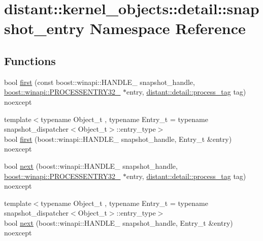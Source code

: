 \hypertarget{namespacedistant_1_1kernel__objects_1_1detail_1_1snapshot__entry}{}\section{distant\+:\+:kernel\+\_\+objects\+:\+:detail\+:\+:snapshot\+\_\+entry Namespace Reference}
\label{namespacedistant_1_1kernel__objects_1_1detail_1_1snapshot__entry}
\subsection*{Functions}
\begin{DoxyCompactItemize}
\item 
bool \mbox{\hyperlink{namespacedistant_1_1kernel__objects_1_1detail_1_1snapshot__entry_ae332dc9e96eff0233330f932eae72330}{first}} (const boost\+::winapi\+::\+H\+A\+N\+D\+L\+E\+\_\+ snapshot\+\_\+handle, \mbox{\hyperlink{namespaceboost_1_1winapi_aa148b1a2cd4a16c95b05b56d8b31cc4c}{boost\+::winapi\+::\+P\+R\+O\+C\+E\+S\+S\+E\+N\+T\+R\+Y32\+\_\+}} $\ast$entry, \mbox{\hyperlink{classdistant_1_1detail_1_1process__tag}{distant\+::detail\+::process\+\_\+tag}} tag) noexcept
\item 
{\footnotesize template$<$typename Object\+\_\+t , typename Entry\+\_\+t  = typename snapshot\+\_\+dispatcher$<$\+Object\+\_\+t$>$\+::entry\+\_\+type$>$ }\\bool \mbox{\hyperlink{namespacedistant_1_1kernel__objects_1_1detail_1_1snapshot__entry_ab69397112f991eeda47c1c4e5843c1c0}{first}} (boost\+::winapi\+::\+H\+A\+N\+D\+L\+E\+\_\+ snapshot\+\_\+handle, Entry\+\_\+t \&entry) noexcept
\item 
bool \mbox{\hyperlink{namespacedistant_1_1kernel__objects_1_1detail_1_1snapshot__entry_a7767a66970fba76928540cfc66294190}{next}} (boost\+::winapi\+::\+H\+A\+N\+D\+L\+E\+\_\+ snapshot\+\_\+handle, \mbox{\hyperlink{namespaceboost_1_1winapi_aa148b1a2cd4a16c95b05b56d8b31cc4c}{boost\+::winapi\+::\+P\+R\+O\+C\+E\+S\+S\+E\+N\+T\+R\+Y32\+\_\+}} $\ast$entry, \mbox{\hyperlink{classdistant_1_1detail_1_1process__tag}{distant\+::detail\+::process\+\_\+tag}} tag) noexcept
\item 
{\footnotesize template$<$typename Object\+\_\+t , typename Entry\+\_\+t  = typename snapshot\+\_\+dispatcher$<$\+Object\+\_\+t$>$\+::entry\+\_\+type$>$ }\\bool \mbox{\hyperlink{namespacedistant_1_1kernel__objects_1_1detail_1_1snapshot__entry_afc790b36a5e3234fe47fb33848a53a08}{next}} (boost\+::winapi\+::\+H\+A\+N\+D\+L\+E\+\_\+ snapshot\+\_\+handle, Entry\+\_\+t \&entry) noexcept

\end{DoxyCompactItemize}
